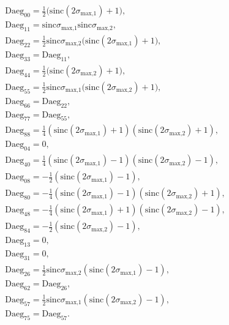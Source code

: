 \documentclass[a4paper,11pt,twoside,openright]{book}
\providecommand{\sinc}{{\mathrm{sinc}}}%
\def\lthtmlcheckvsize{\ifdim\ht\sizebox<\vsize 
  \ifdim\wd\sizebox<\hsize\expandafter\hfill\fi \expandafter\vfill
  \else\expandafter\vss\fi}%
\begin{document}
{\newpage\clearpage
\setcounter{equation}{72}
%
\begin{subequations}\begin{align}
&\textrm{Daeg}_{00} = \tfrac{1}{2}\big( \sinc (2\sigma_{\textrm{max,1}}) + 1 \big) , \\
&\textrm{Daeg}_{11} = \sinc \sigma_{\textrm{max,1}}\sinc \sigma_{\textrm{max,2}}, \\
&\textrm{Daeg}_{22} = \tfrac{1}{2}\sinc \sigma_{\textrm{max,2}}\big( \sinc (2\sigma_{\textrm{max,1}}) + 1 \big) , \\
&\textrm{Daeg}_{33} = \textrm{Daeg}_{11} , \\
&\textrm{Daeg}_{44} = \tfrac{1}{2}\big( \sinc (2\sigma_{\textrm{max,2}}) + 1 \big) , \\
&\textrm{Daeg}_{55} = \tfrac{1}{2}\sinc \sigma_{\textrm{max,1}}\big( \sinc (2\sigma_{\textrm{max,2}}) + 1 \big) , \\
&\textrm{Daeg}_{66} = \textrm{Daeg}_{22} , \\
&\textrm{Daeg}_{77} = \textrm{Daeg}_{55} , \\
&\textrm{Daeg}_{88} = \tfrac{1}{4}\left( \sinc (2\sigma_{\textrm{max,1}}) + 1 \right) \left( \sinc (2\sigma_{\textrm{max,2}}) + 1 \right) , \\
&\textrm{Daeg}_{04} = 0 , \\
&\textrm{Daeg}_{40} = \tfrac{1}{4}\left( \sinc (2\sigma_{\textrm{max,1}}) - 1 \right) \left( \sinc (2\sigma_{\textrm{max,2}}) - 1 \right) , \\
&\textrm{Daeg}_{08} = -\tfrac{1}{2}\left( \sinc (2\sigma_{\textrm{max,1}}) - 1 \right) , \\
&\textrm{Daeg}_{80} = -\tfrac{1}{4}\left( \sinc (2\sigma_{\textrm{max,1}}) - 1 \right) \left( \sinc (2\sigma_{\textrm{max,2}}) + 1 \right) , \\
&\textrm{Daeg}_{48} = -\tfrac{1}{4}\left( \sinc (2\sigma_{\textrm{max,1}}) + 1 \right) \left( \sinc (2\sigma_{\textrm{max,2}}) - 1 \right) , \\
&\textrm{Daeg}_{84} = -\tfrac{1}{2}\left( \sinc (2\sigma_{\textrm{max,2}}) - 1 \right) , \\
&\textrm{Daeg}_{13} = 0 , \\
&\textrm{Daeg}_{31} = 0 , \\
&\textrm{Daeg}_{26} = \tfrac{1}{2}\sinc \sigma_{\textrm{max,2}}\left( \sinc (2\sigma_{\textrm{max,1}}) - 1 \right) , \\
&\textrm{Daeg}_{62} = \textrm{Daeg}_{26} , \\
&\textrm{Daeg}_{57} = \tfrac{1}{2}\sinc \sigma_{\textrm{max,1}}\left( \sinc (2\sigma_{\textrm{max,2}}) - 1 \right) , \\
&\textrm{Daeg}_{75} = \textrm{Daeg}_{57} .
\end{align}\end{subequations}%
\lthtmldisplayZ
\lthtmlcheckvsize\clearpage}
\end{document}
